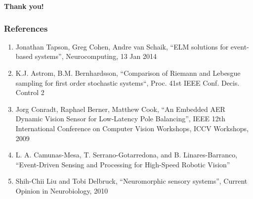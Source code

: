 \documentclass[11pt,center]{beamer}
\begin{document}
	\begin{frame}[plain,c]
		\begin{center}
			\Large{\textbf{Thank you!}}
		\end{center}
	\end{frame}
	\begin{frame}[allowframebreaks]
		\frametitle{References}
		\begin{enumerate}
			\item Jonathan Tapson, Greg Cohen, Andre van Schaik, ``ELM solutions for event-based systems'',
				Neurocomputing, 13 Jan 2014
			\item K.J. Astrom, B.M. Bernhardsson, ``Comparison of Riemann and Lebesgue sampling for
				first order stochastic systems``, Proc. 41st IEEE Conf. Decis. Control 2
			\item Jorg Conradt, Raphael Berner, Matthew Cook, ``An Embedded AER Dynamic Vision Sensor for
				Low-Latency Pole Balancing'', IEEE 12th International Conference on Computer Vision
				Workshops, ICCV Workshops, 2009
			\item L. A. Camunas-Mesa, T. Serrano-Gotarredona, and B. Linares-Barranco, ``Event-Driven Sensing and Processing for
				High-Speed Robotic Vision''
			\item Shih-Chii Liu and Tobi Delbruck, ``Neuromorphic sensory systems'', Current Opinion in Neurobiology, 2010
		\end{enumerate}

	\end{frame}
\end{document}
